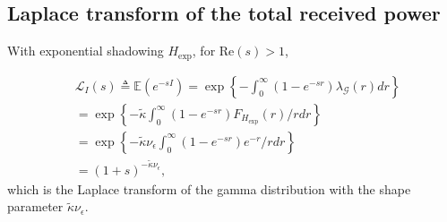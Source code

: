 \documentclass[lettersize,journal]{IEEEtran}
\begin{document}





\subsection{Laplace transform of the total received power}

With exponential shadowing ${H}_{\text{exp}}$, for Re$(s)>1$,

\begin{align}
  \label{eq:lapdef}
  &\mathcal{L}_{I}(s)\triangleq \mathbb{E}\left(e^{-sI}\right)= \exp\left\{-\int_0^{\infty}(1-e^{-sr}) \lambda_{\mathcal{G}}(r) dr \right\} \nonumber \\
  &=\exp\left\{-\tilde{\kappa}\int_0^{\infty}(1-e^{-sr}) F_{{H}_{\text{exp}}}(r) /r dr \right\} \nonumber \\
  &=\exp\left\{-\tilde{\kappa}\nu_{\epsilon}\int_0^{\infty}(1-e^{-sr}) e^{-r} /r dr \right\} \nonumber \\
  &=(1+s)^{-\tilde{\kappa}\nu_{\epsilon}},
\end{align}
which is the Laplace transform of the gamma distribution with the shape parameter $\tilde{\kappa}\nu_{\epsilon}$. 
\end{document}

